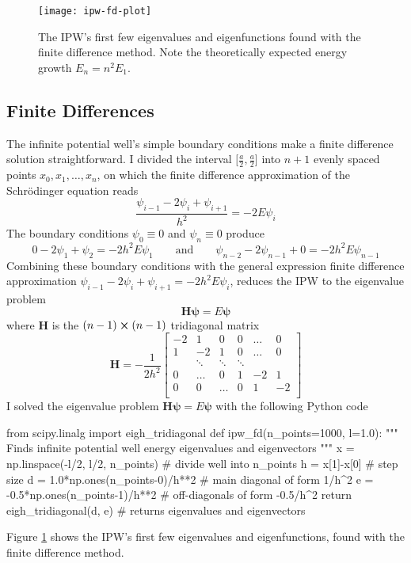 \documentclass[11pt, a4paper]{article}
\newcommand{\eqtext}[1]{\qquad \text{#1} \qquad}
\newcommand{\schro}{Schr\"{o}dinger\xspace}
\begin{document}
\begin{figure}[htb!]
\centering
\texttt{[image: ipw-fd-plot]}
\caption{The IPW's first few eigenvalues and eigenfunctions found with the finite difference method. Note the theoretically expected energy growth $ E_{n} = n^{2}E_{1} $.}
\label{bvp:fig:ipw-fd-plot}
\end{figure}

\subsection{Finite Differences}
The infinite potential well's simple boundary conditions make a finite difference solution straightforward. I divided the interval $ \big[\frac{a}{2}, \frac{a}{2}\big] $ into $ n + 1 $ evenly spaced points $ x_{0}, x_{1}, \ldots, x_{n}$, on which the finite difference approximation of the \schro equation reads
\begin{equation*}
	\frac{\psi_{i-1} - 2\psi_{i} + \psi_{i+1}}{h^{2}} = -2E\psi_{i}
\end{equation*}
The boundary conditions $ \psi_{0} \equiv 0 $ and $ \psi_{n} \equiv 0 $ produce
\begin{equation*}
	0 -2\psi_{1} + \psi_{2} = -2h^{2}E\psi_{1} \eqtext{and} \psi_{n-2} -2\psi_{n-1} + 0 = -2h^{2}E\psi_{n-1}
\end{equation*}
Combining these boundary conditions with the general expression finite difference approximation $ \psi_{i-1} - 2\psi_{i} + \psi_{i+1} = -2h^{2}E\psi_{i} $, reduces the IPW to the eigenvalue problem
\begin{equation*}
	\mathbf{H} \bm{\psi} = E \bm{\psi}
\end{equation*}
where $ \mathbf{H} $ is the $ (n-1) \cross (n-1) $ tridiagonal matrix
\begin{equation*}
	\mathbf{H} = -\frac{1}{2h^{2}}
	\begin{bmatrix}
		-2 & 1 & 0 & 0 & \ldots & 0\\
		1 & -2 & 1 & 0 & \ldots & 0\\
		& \ddots & \ddots & \ddots & &\\
		0 & \ldots & 0 & 1 & -2 & 1\\
		0 & 0 & \ldots & 0 & 1 & -2\\
	\end{bmatrix}
\end{equation*}
I solved the eigenvalue problem $ \mathbf{H} \bm{\psi} = E \bm{\psi} $ with the following Python code
\begin{python}
from scipy.linalg import eigh_tridiagonal
def ipw_fd(n_points=1000, l=1.0):
""" Finds infinite potential well energy eigenvalues and eigenvectors """
    x = np.linspace(-l/2, l/2, n_points)  # divide well into n_points
    h = x[1]-x[0]  # step size
    d = 1.0*np.ones(n_points-0)/h**2  # main diagonal of form 1/h^2
    e = -0.5*np.ones(n_points-1)/h**2  # off-diagonals of form -0.5/h^2
    return eigh_tridiagonal(d, e)  # returns eigenvalues and eigenvectors
\end{python}
Figure \ref{bvp:fig:ipw-fd-plot} shows the IPW's first few eigenvalues and eigenfunctions, found with the finite difference method.
\end{document}
